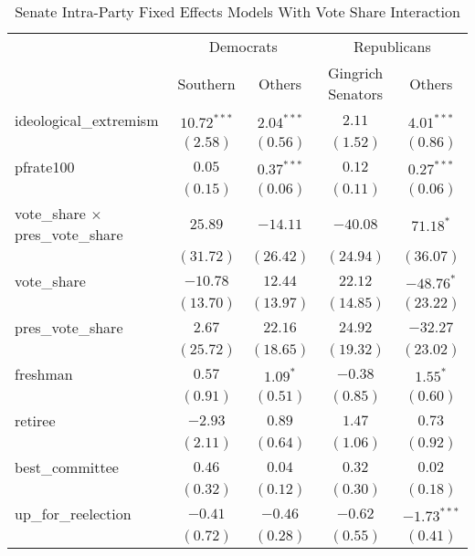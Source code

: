 \documentclass[12pt]{article}
\begin{document}
\begin{table}[H]
	\begin{center}
		\caption{Senate Intra-Party Fixed Effects Models With Vote Share Interaction}
		\begin{tabular}{l c c c c }
			\hline
			& \multicolumn{2}{c}{Democrats} & \multicolumn{2}{c}{Republicans} \\
			\cline{2-5}
			& Southern & Others & Gingrich Senators & Others \\
			\hline
			ideological\_extremism        & $10.72^{***}$ & $2.04^{***}$ & $2.11$    & $4.01^{***}$  \\
			& $(2.58)$      & $(0.56)$     & $(1.52)$  & $(0.86)$      \\
			pfrate100                     & $0.05$        & $0.37^{***}$ & $0.12$    & $0.27^{***}$  \\
			& $(0.15)$      & $(0.06)$     & $(0.11)$  & $(0.06)$      \\
			vote\_share $ \times $ pres\_vote\_share & $25.89$       & $-14.11$     & $-40.08$  & $71.18^{*}$   \\
			& $(31.72)$     & $(26.42)$    & $(24.94)$ & $(36.07)$     \\
			vote\_share                   & $-10.78$      & $12.44$      & $22.12$   & $-48.76^{*}$  \\
			& $(13.70)$     & $(13.97)$    & $(14.85)$ & $(23.22)$     \\
			pres\_vote\_share             & $2.67$        & $22.16$      & $24.92$   & $-32.27$      \\
			& $(25.72)$     & $(18.65)$    & $(19.32)$ & $(23.02)$     \\
			freshman                      & $0.57$        & $1.09^{*}$   & $-0.38$   & $1.55^{*}$    \\
			& $(0.91)$      & $(0.51)$     & $(0.85)$  & $(0.60)$      \\
			retiree                       & $-2.93$       & $0.89$       & $1.47$    & $0.73$        \\
			& $(2.11)$      & $(0.64)$     & $(1.06)$  & $(0.92)$      \\
			best\_committee               & $0.46$        & $0.04$       & $0.32$    & $0.02$        \\
			& $(0.32)$      & $(0.12)$     & $(0.30)$  & $(0.18)$      \\
			up\_for\_reelection           & $-0.41$       & $-0.46$      & $-0.62$   & $-1.73^{***}$ \\
			& $(0.72)$      & $(0.28)$     & $(0.55)$  & $(0.41)$      \\

\end{tabular}
\end{center}
\end{table}
\end{document}
